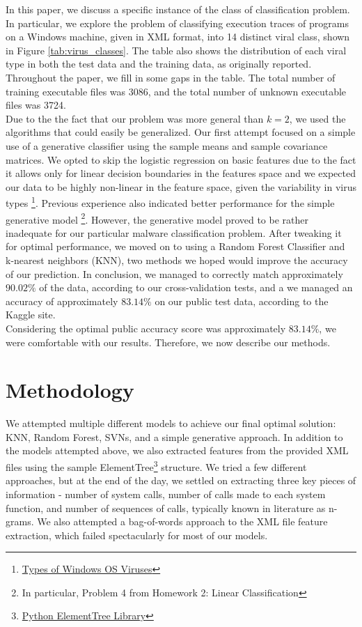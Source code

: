 \documentclass[letterpaper]{article}
\begin{document}
\noindent In this paper, we discuss a specific instance of the class of classification problem. In particular, we explore the problem of classifying execution traces of programs on a Windows machine, given in XML format, into 14 distinct viral class, shown in Figure \ref{tab:virus_classes}. The table also shows the distribution of each viral type in both the test data and the training data, as originally reported. Throughout the paper, we fill in some gaps in the table. The total number of training executable files was 3086, and the total number of unknown executable files was 3724.\\

\noindent Due to the the fact that our problem was more general than $k = 2$, we used the algorithms that could easily be generalized. Our first attempt focused on a simple use of a generative classifier using the sample means and sample covariance matrices. We opted to skip the logistic regression on basic features due to the fact it allows only for linear decision boundaries in the features space and we expected our data to be highly non-linear in the feature space, given the variability in virus types \footnote{\href{http://www.omnisecu.com/security/types-of-computer-viruses.php}{Types of Windows OS Viruses}}. Previous experience also indicated better performance for the simple generative model \footnote{In particular, Problem 4 from Homework 2: Linear Classification}. However, the generative model proved to be rather inadequate for our particular malware classification problem. After tweaking it for optimal performance, we moved on to using a Random Forest Classifier and k-nearest neighbors (KNN), two methods we hoped would improve the accuracy of our prediction. In conclusion, we managed to correctly match approximately $90.02\%$ of the data, according to our cross-validation tests, and a we managed an accuracy of approximately $83.14\%$ on our public test data, according to the Kaggle site.\\
 
\noindent Considering the optimal public accuracy score was approximately $83.14\%$, we were comfortable with our results. Therefore, we now describe our methods.

\section{Methodology}
We attempted multiple different models to achieve our final optimal solution: KNN, Random Forest, SVNs, and a simple generative approach. In addition to the models attempted above, we also extracted features from the provided XML files using the sample ElementTree\footnote{\href{https://docs.python.org/3/library/xml.etree.elementtree.html}{Python ElementTree Library}} structure. We tried a few different approaches, but at the end of the day, we settled on extracting three key pieces of information - number of system calls, number of calls made to each system function, and number of sequences of calls, typically known in literature as n-grams. We also attempted a bag-of-words approach to the XML file feature extraction, which failed spectacularly for most of our models.
\end{document}
